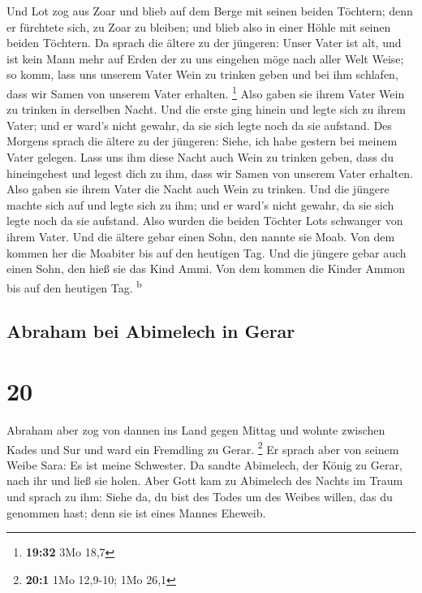  Und Lot zog aus Zoar und blieb auf dem Berge mit seinen
beiden Töchtern; denn er fürchtete sich, zu Zoar zu bleiben; und blieb
also in einer Höhle mit seinen beiden Töchtern.  Da
sprach die ältere zu der jüngeren: Unser Vater ist alt, und ist kein
Mann mehr auf Erden der zu uns eingehen möge nach aller Welt Weise;
 so komm, lass uns unserem Vater Wein zu trinken geben
und bei ihm schlafen, dass wir Samen von unserem Vater erhalten.
\footnote{\textbf{19:32} 3Mo 18,7}  Also gaben sie ihrem
Vater Wein zu trinken in derselben Nacht. Und die erste ging hinein und
legte sich zu ihrem Vater; und er ward's nicht gewahr, da sie sich legte
noch da sie aufstand.  Des Morgens sprach die ältere zu
der jüngeren: Siehe, ich habe gestern bei meinem Vater gelegen. Lass uns
ihm diese Nacht auch Wein zu trinken geben, dass du hineingehest und
legest dich zu ihm, dass wir Samen von unserem Vater erhalten.
 Also gaben sie ihrem Vater die Nacht auch Wein zu
trinken. Und die jüngere machte sich auf und legte sich zu ihm; und er
ward's nicht gewahr, da sie sich legte noch da sie aufstand.
 Also wurden die beiden Töchter Lots schwanger von ihrem
Vater.  Und die ältere gebar einen Sohn, den nannte sie
Moab. Von dem kommen her die Moabiter bis auf den heutigen Tag.
 Und die jüngere gebar auch einen Sohn, den hieß sie das
Kind Ammi. Von dem kommen die Kinder Ammon bis auf den heutigen Tag.
\textsuperscript{b}

\hypertarget{abraham-bei-abimelech-in-gerar}{%
\subsection{Abraham bei Abimelech in
Gerar}\label{abraham-bei-abimelech-in-gerar}}

\hypertarget{section-19}{%
\section{20}\label{section-19}}

 Abraham aber zog von dannen ins Land gegen Mittag und
wohnte zwischen Kades und Sur und ward ein Fremdling zu Gerar.
\footnote{\textbf{20:1} 1Mo 12,9-10; 1Mo 26,1}  Er sprach
aber von seinem Weibe Sara: Es ist meine Schwester. Da sandte Abimelech,
der König zu Gerar, nach ihr und ließ sie holen.  Aber
Gott kam zu Abimelech des Nachts im Traum und sprach zu ihm: Siehe da,
du bist des Todes um des Weibes willen, das du genommen hast; denn sie
ist eines Mannes Eheweib.

